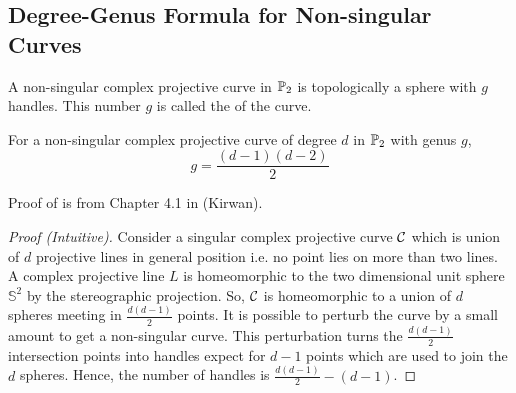 \subsection{Degree-Genus Formula for Non-singular Curves}

\begin{definition}[genus]
    A non-singular complex projective curve in $\mathbb P_2$ is topologically a sphere with $g$ handles. This number $g$ is called the  of the curve.
\end{definition}

\begin{theorem}\label{thm:degree_genus}
    For a non-singular complex projective curve of degree $d$ in $\mathbb P_2$ with genus $g$, $$g=\frac{(d-1)(d-2)}{2}$$
\end{theorem}

Proof of  is from Chapter 4.1 in \cite{ref:kirwan} (Kirwan).

\begin{proof}[Proof (Intuitive)]
    Consider a singular complex projective curve $\mathcal C$ which is union of $d$ projective lines in general position i.e. no point lies on more than two lines. A complex projective line $L$ is homeomorphic to the two dimensional unit sphere $\mathbb{S}^2$ by the stereographic projection. So, $\mathcal C$ is homeomorphic to a union of $d$ spheres meeting in $\frac{d(d-1)}{2}$ points. It is possible to perturb the curve by a small amount to get a non-singular curve. This perturbation turns the $\frac{d(d-1)}{2}$ intersection points into handles expect for $d-1$ points which are used to join the $d$ spheres. Hence, the number of handles is $\frac{d(d-1)}{2}-(d-1)$.
\end{proof}

